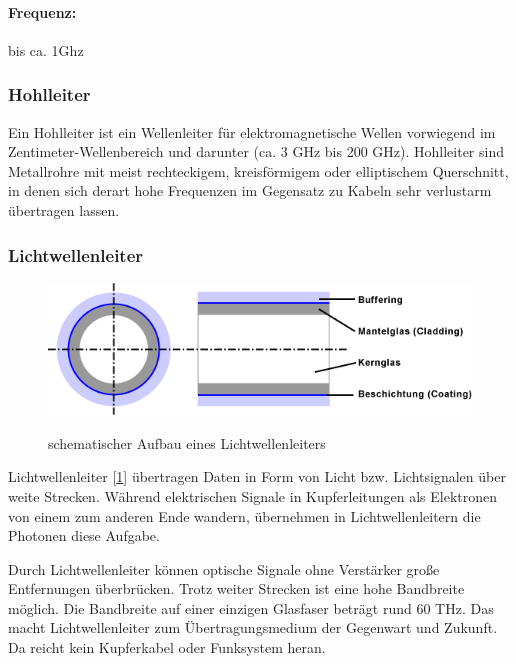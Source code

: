 \documentclass[a4paper,10pt]{article}
\begin{document}
\paragraph{Frequenz:}bis ca. 1Ghz\\

\subsubsection{Hohlleiter}
Ein Hohlleiter ist ein Wellenleiter für elektromagnetische Wellen vorwiegend im Zentimeter-Wellenbereich und darunter (ca. 3 GHz bis 200 GHz). Hohlleiter sind Metallrohre 
mit meist rechteckigem, kreisförmigem oder elliptischem Querschnitt, in denen sich derart hohe Frequenzen im Gegensatz zu Kabeln sehr verlustarm übertragen lassen.


\subsubsection{Lichtwellenleiter}
\begin{figure}[!htb]
\centering
\includegraphics[scale=0.5]{LWL.png}\\
\caption{schematischer Aufbau eines Lichtwellenleiters}%
\label{lichtwellenleiter}
\end{figure}

Lichtwellenleiter [\ref{lichtwellenleiter}] übertragen Daten in Form von Licht bzw. Lichtsignalen über weite Strecken. Während elektrischen Signale in Kupferleitungen
als Elektronen von einem zum anderen Ende wandern, übernehmen in Lichtwellenleitern die Photonen diese Aufgabe.

Durch Lichtwellenleiter können optische Signale ohne Verstärker große Entfernungen überbrücken. Trotz weiter Strecken ist eine hohe Bandbreite möglich. 
Die Bandbreite auf einer einzigen Glasfaser beträgt rund 60 THz. Das macht Lichtwellenleiter zum Übertragungsmedium der Gegenwart und Zukunft. Da reicht kein Kupferkabel oder Funksystem heran.
\end{document}
